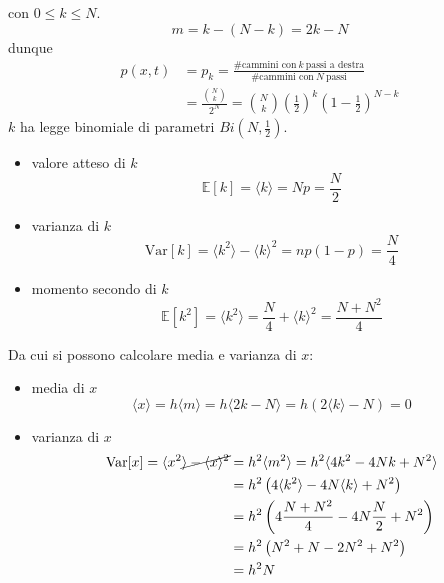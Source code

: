 \documentclass[10pt,a4paper,twoside,openright]{book}
\begin{document}
con $\displaystyle 0\leqslant k\leqslant N$.
\begin{equation*}
    m=k-(N-k) =2k-N
\end{equation*}
dunque
\begin{align*}
    p(x,t) & =p_{k} =\frac{\text{\#cammini con} \ k\ \text{passi a destra}}{\text{\#cammini con} \ N\ \text{passi}} \\
           & =\frac{\binom{N}{k}}{2^{N}} =\binom{N}{k}\left(\frac{1}{2}\right)^{k}\left(1-\frac{1}{2}\right)^{N-k}
\end{align*}
$k$ ha legge binomiale di parametri $\displaystyle Bi\left(N,\frac{1}{2}\right)$.
\begin{itemize}
    \item valore atteso di $k$
          \begin{equation*}
              \mathbb{E}[k]=\langle k\rangle =Np=\frac{N}{2}
          \end{equation*}
    \item varianza di $k$
          \begin{equation*}
              \mathrm{Var}[k]=\langle k^{2} \rangle -\langle k\rangle ^{2} =np(1-p)=\frac{N}{4}
          \end{equation*}
    \item momento secondo di $k$
          \begin{equation*}
              \mathbb{E}[k^2]=\langle k^{2} \rangle =\frac{N}{4} +\langle k\rangle ^{2} =\frac{N+N^2}{4}
          \end{equation*}
\end{itemize}

Da cui si possono calcolare media e varianza di $x$:
\begin{itemize}
    \item media di $x$
          \begin{equation*}
              \langle x\rangle =h\langle m\rangle =h\langle 2k-N\rangle =h(2\langle k\rangle -N) =0
          \end{equation*}
    \item varianza di $x$
          \begin{align*}
              \mathrm{Var}[x]=\langle x^{2} \cancel{\rangle -\langle x \rangle^2} & =h^{2} \langle m^{2} \rangle =h^{2} \langle 4k^{2} -4Nk+N^{2} \rangle \\
                                                                                  & =h^{2}\left(4\langle k^{2} \rangle -4N\langle k\rangle +N^{2}\right)  \\
                                                                                  & =h^{2}\left(4 \frac{N+N^2}{4} -4 N \frac{N}{2} + N^2 \right)          \\
                                                                                  & =h^{2}\left(N^{2} +N-2N^{2} +N^{2}\right)                             \\
                                                                                  & =h^{2} N
          \end{align*}
\end{itemize}
\end{document}
